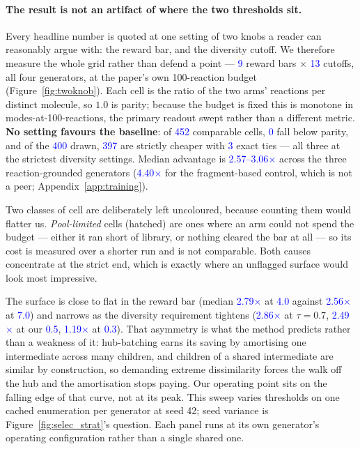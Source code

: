 \documentclass{article}
\newcommand{\checkval}[1]{\textcolor{blue}{#1}}
\begin{document}
\paragraph{The result is not an artifact of where the two thresholds sit.}
Every headline number is quoted at one setting of two knobs a reader can reasonably
argue with: the reward bar, and the diversity cutoff. We therefore measure the whole
grid rather than defend a point --- \checkval{9} reward bars $\times$ \checkval{13}
cutoffs, all four generators, at the paper's own 100-reaction budget
(Figure~\ref{fig:twoknob}). Each cell is the ratio of the two arms' reactions per
distinct molecule, so $1.0$ is parity; because the budget is fixed this is monotone in
modes-at-100-reactions, the primary readout swept rather than a different metric.
\textbf{No setting favours the baseline}: of \checkval{452} comparable cells,
\checkval{0} fall below parity, and of the \checkval{400} drawn, \checkval{397} are
strictly cheaper with \checkval{3} exact ties --- all three at the strictest diversity
settings. Median advantage is \checkval{2.57--3.06$\times$} across the three
reaction-grounded generators (\checkval{4.40$\times$} for the fragment-based control,
which is not a peer; Appendix~\ref{app:training}).

Two classes of cell are deliberately left uncoloured, because counting them would
flatter us. \emph{Pool-limited} cells (hatched) are ones where an arm could not spend
the budget --- either it ran short of library, or nothing cleared the bar at all --- so
its cost is measured over a shorter run and is not comparable. Both causes concentrate
at the strict end, which is exactly where an unflagged surface would look most
impressive.

The surface is close to flat in the reward bar (median \checkval{2.79$\times$} at
\checkval{4.0} against \checkval{2.56$\times$} at \checkval{7.0}) and narrows as the
diversity requirement tightens (\checkval{2.86$\times$} at $\tau=0.7$,
\checkval{2.49$\times$} at our \checkval{0.5}, \checkval{1.19$\times$} at
\checkval{0.3}). That asymmetry is what the method predicts rather than a weakness of
it: hub-batching earns its saving by amortising one intermediate across many children,
and children of a shared intermediate are similar by construction, so demanding extreme
dissimilarity forces the walk off the hub and the amortisation stops paying. Our
operating point sits on the falling edge of that curve, not at its peak. This sweep
varies thresholds on one cached enumeration per generator at seed 42; seed variance is
Figure~\ref{fig:selec_strat}'s question. Each panel runs at its own generator's operating
configuration rather than a single shared one.
\end{document}
